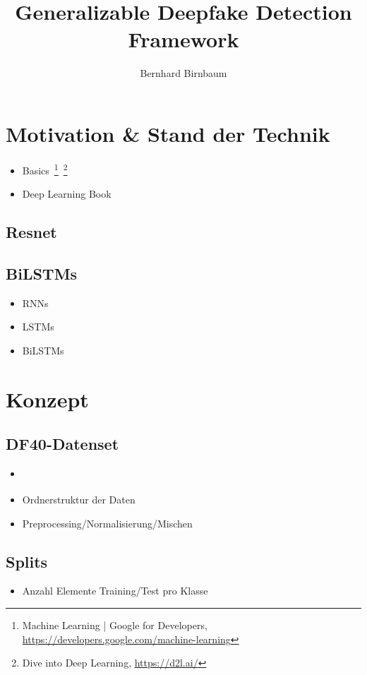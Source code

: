 \documentclass{article}
\title{Generalizable Deepfake Detection Framework}
\author{Bernhard Birnbaum}
\begin{document}
    \maketitle

    \section{Motivation \& Stand der Technik}
    \begin{itemize}
        \item Basics~\footnote{Machine Learning | Google for Developers, \url{https://developers.google.com/machine-learning}}~\footnote{Dive into Deep Learning, \url{https://d2l.ai/}}
        \item Deep Learning Book~\cite{deeplearningbook}
    \end{itemize}
    \subsection{Resnet}
    \subsection{BiLSTMs}
    \begin{itemize}
        \item RNNs
        \item LSTMs
        \item BiLSTMs %
    \end{itemize}
    \section{Konzept}
    \subsection{DF40-Datenset}
    \begin{itemize}
        \item \cite{yan2024df40}
        \item Ordnerstruktur der Daten
        \item Preprocessing/Normalisierung/Mischen
    \end{itemize}
    \subsection{Splits}
    \begin{itemize}
        \item Anzahl Elemente Training/Test pro Klasse
    \end{itemize}
\end{document}
